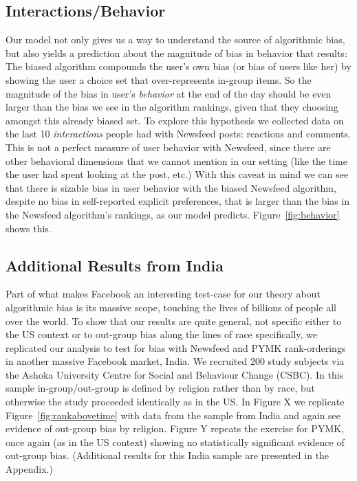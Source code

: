 \documentclass[12pt,letterpaper]{article}
\begin{document}
\subsection{Interactions/Behavior}
Our model not only gives us a way to understand the source of algorithmic bias, but also yields a prediction about the magnitude of bias in behavior that results: The biased algorithm compounds the user's own bias (or bias of users like her) by showing the user a choice set that over-represents in-group items. So the magnitude of the bias in user's \emph{behavior} at the end of the day should be even larger than the bias we see in the algorithm rankings, given that they choosing amongst this already biased set. To explore this hypothesis we collected data on the last 10 \emph{interactions} people had with Newsfeed posts: reactions and comments. This is not a perfect measure of user behavior with Newsfeed, since there are other behavioral dimensions that we cannot mention in our setting (like the time the user had spent looking at the post, etc.) With this caveat in mind we can see that there is sizable bias in user behavior with the biased Newsfeed algorithm, despite no bias in self-reported explicit preferences, that is larger than the bias in the Newsfeed algorithm's rankings, as our model predicts.  Figure~\ref{fig:behavior} shows this. 

\subsection{Additional Results from India}

Part of what makes Facebook an interesting test-case for our theory about algorithmic bias is its massive scope, touching the lives of billions of people all over the world. To show that our results are quite general, not specific either to the US context or to out-group bias along the lines of race specifically, we replicated our analysis to test for bias with Newsfeed and PYMK rank-orderings in another massive Facebook market, India. We recruited 200 study subjects via the Ashoka University Centre for Social and Behaviour Change (CSBC). In this sample in-group/out-group is defined by religion rather than by race, but otherwise the study proceeded identically as in the US. In Figure X we replicate Figure~\ref{fig:rankabovetime} with data from the sample from India and again see evidence of out-group bias by religion. Figure Y repeats the exercise for PYMK, once again (as in the US context) showing no statistically significant evidence of out-group bias. (Additional results for this India sample are presented in the Appendix.)
\end{document}
